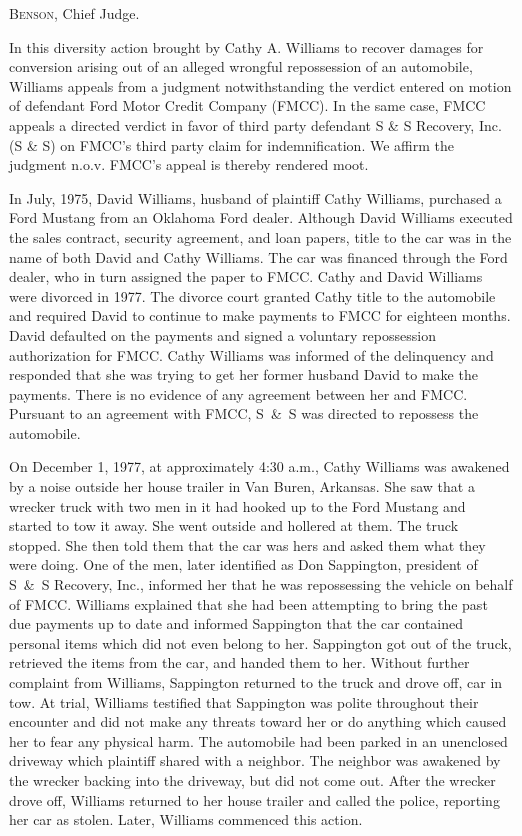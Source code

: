 
\opinion \textsc{Benson}, Chief Judge.

In this diversity action brought by Cathy A. Williams to recover damages for
conversion arising out of an alleged wrongful repossession of an automobile,
Williams appeals from a judgment notwithstanding the verdict entered on motion
of defendant Ford Motor Credit Company (FMCC). In the same case, FMCC appeals a
directed verdict in favor of third party defendant S \& S Recovery, Inc. (S \&
S) on FMCC's third party claim for indemnification. We affirm the judgment
n.o.v. FMCC's appeal is thereby rendered moot.

In July, 1975, David Williams, husband of plaintiff Cathy Williams, purchased a
Ford Mustang from an Oklahoma Ford dealer. Although David Williams executed the
sales contract, security agreement, and loan papers, title to the car was in
the name of both David and Cathy Williams. The car was financed through the
Ford dealer, who in turn assigned the paper to FMCC. Cathy and David Williams
were divorced in 1977. The divorce court granted Cathy title to the automobile
and required David to continue to make payments to FMCC for eighteen months.
David defaulted on the payments and signed a voluntary repossession
authorization for FMCC. Cathy Williams was informed of the delinquency and
responded that she was trying to get her former husband David to make the
payments. There is no evidence of any agreement between her and FMCC. Pursuant
to an agreement with FMCC, S~\&~S was directed to repossess the automobile.

On December 1, 1977, at approximately 4:30 a.m., Cathy Williams was awakened by
a noise outside her house trailer in Van Buren,
Arkansas. She saw that a wrecker truck with two
men in it had hooked up to the Ford Mustang and started to tow it away. She went
outside and hollered at them. The truck stopped. She then told them that the car
was hers and asked them what they were doing. One of the men, later identified
as Don Sappington, president of S~\&~S Recovery, Inc., informed her that he was
repossessing the vehicle on behalf of FMCC. Williams explained that she had been
attempting to bring the past due payments up to date and informed Sappington
that the car contained personal items which did not even belong to her.
Sappington got out of the truck, retrieved the items from the car, and handed
them to her. Without further complaint from Williams, Sappington returned to the
truck and drove off, car in tow. At trial, Williams testified that Sappington
was polite throughout their encounter and did not make any threats toward her or
do anything which caused her to fear any physical harm. The automobile had been
parked in an unenclosed driveway which plaintiff shared with a neighbor. The
neighbor was awakened by the wrecker backing into the driveway, but did not come
out. After the wrecker drove off, Williams returned to her house trailer and
called the police, reporting her car as stolen. Later, Williams commenced this
action.

